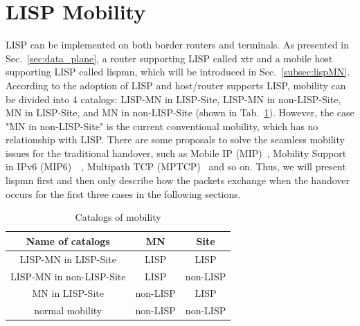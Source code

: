 \section{LISP Mobility}
\label{sec:lisp_mobility}
LISP can be implemented on both border routers and terminals. As presented in Sec.~\ref{sec:data_plane}, a router supporting LISP called \acrshort{xtr} and a mobile host supporting LISP called \acrfull{lispmn}, which will be introduced in Sec.~\ref{subsec:lispMN}. According to the adoption of LISP and host/router supports LISP, mobility can be divided into 4 catalogs: LISP-MN in LISP-Site, LISP-MN in non-LISP-Site, MN in LISP-Site, and MN in non-LISP-Site (shown in Tab.~\ref{mobility_catalogs}). However, the case "MN in non-LISP-Site" is the current conventional mobility, which has no relationship with LISP. There are some proposals to solve the seamless mobility issues for the traditional handover, such as Mobile IP (MIP)~\cite{perkins1997mobile}, Mobility Support in IPv6 (MIP6)~\cite{perkins2011mobility}~\cite{minolisecurity}, Multipath TCP (MPTCP)~\cite{ford2013tcp} and so on. Thus, we will present \acrshort{lispmn} first and then only describe how the packets exchange when the handover occurs for the first three cases in the following sections.

\begin{table}[!tb]
    \centering
    \caption{Catalogs of mobility}
    \label{mobility_catalogs}{
        \begin{tabular}{@{}c|c|c@{}}
			\hline\hline
    		Name of catalogs & MN  & Site    	\\  \hline 
    		LISP-MN in LISP-Site & LISP  & LISP    	\\  \hline 
    		LISP-MN in non-LISP-Site & LISP  & non-LISP    	\\  \hline    
    		MN in LISP-Site & non-LISP  & LISP    	\\  \hline    
    		normal mobility & non-LISP  & non-LISP    	\\  \hline \hline                   
    	\end{tabular}
    }
\end{table}


